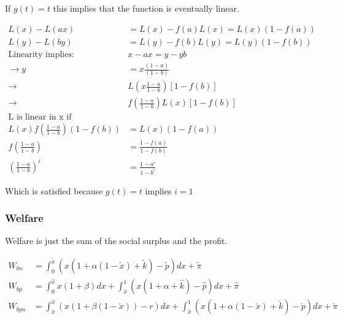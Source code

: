 \documentclass[12pt]{article}
\numberwithin{equation}{section}
\begin{document}
If $g(t)= t$ this implies that the function is eventually linear. 

\begin{align}
L(x)-L(a x) &= L(x) - f(a)L(x) = L(x)(1-f(a)) \\
L(y)-L(b y) &= L(y) - f(b)L(y) = L(y)(1-f(b)) \\
\text{Linearity  implies:}&
x-ax = y-yb \\
\rightarrow y & = x \frac{(1-a)}{(1-b)} \\
\rightarrow &L\left(x \frac{1-a}{1-b}\right)[1-f(b)] \\
\rightarrow &f\left( \frac{1-a}{1-b}\right)L(x)[1-f(b)] \\
\text{L is linear in x if}& \\
L(x)f\left(\frac{1-a}{1-b}\right)(1-f(b)) &= L(x)(1-f(a)) \\
f\left(\frac{1-a}{1-b} \right) &= \frac{1-f(a)}{1-f(b)} \\
\left(\frac{1-a}{1-b} \right)^i &= \frac{1-a^i}{1-b^i} 
\end{align}

Which is satisfied because $g(t)=t$ implies $i=1$

\subsubsection{Welfare}

Welfare is just the sum of the social surplus and the profit.

\begin{align*}
W_{bn} &= \int^{\tilde{x}}_0 \left(x(1+\alpha(1-\tilde{x})+\tilde{k})-\tilde{p} \right) dx + \tilde{\pi}  \\
W_{bp} &= \int^{\hat{x}}_0 x(1+\beta) dx +\int^{1}_{\hat{x}} \left(x(1+\alpha+\hat{k}) - \hat{p} \right) dx + \hat{\pi} \\
W_{bpn} &=
\int^{\hat{x}}_{\check{x}} \left(x(1+\beta(1-\check{x}))-r \right)dx +\int^{1}_{\hat{x}} \left(x(1+\alpha(1-\check{x})+\check{k}) - \check{p} \right) dx + \check{\pi}
\end{align*}

\end{document}
